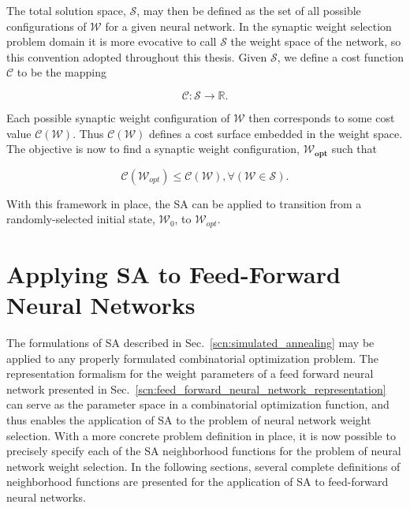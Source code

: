 \documentclass[11pt]{afthesis}
\begin{document}
	 \noindent The total solution space, $\boldsymbol{\mathcal{S}}$, may then be defined as the set of all possible configurations of $\boldsymbol{\mathcal{W}}$ for a given neural network. In the synaptic weight selection problem domain it is more evocative to call $\boldsymbol{\mathcal{S}}$ the weight space of the network, so this convention adopted throughout this thesis. Given $\boldsymbol{\mathcal{S}}$, we define a cost function $ \mathcal{C}$ to be the mapping
	 
	 \begin{equation*} \label{eq:cost_mapping_ffnn}
	 \mathcal{C} : \boldsymbol{\mathcal{S}} \rightarrow \mathbb{R}.
	 \end{equation*}
	 
	 
	 Each possible synaptic weight configuration of $\boldsymbol{\mathcal{W}}$ then corresponds to some cost value $\mathcal{C}(\boldsymbol{\mathcal{W}})$. Thus $\mathcal{C}(\boldsymbol{\mathcal{W}})$ defines a cost surface embedded in the weight space. The objective is now to find a synaptic weight configuration, $\boldsymbol{\mathcal{W}_{opt}}$ such that 
	 
	 \begin{equation*} \label{eq:optimal_definition}
	 \mathcal{C}(\boldsymbol{\mathcal{W}}_{opt}) \leq \mathcal{C}\left( \boldsymbol{\mathcal{W}}\right) , \forall\left(  \boldsymbol{\mathcal{W}} \in \boldsymbol{\mathcal{S}}\right) .
	 \end{equation*}
	 
	 \noindent With this framework in place, the SA can be applied to transition from a randomly-selected initial state, $\boldsymbol{\mathcal{W}}_0$, to $\boldsymbol{\mathcal{W}}_{opt}$.
	 

	\section{Applying SA to Feed-Forward Neural Networks}
	
	The formulations of SA described in Sec.~\ref{scn:simulated_annealing} may be applied to any properly formulated combinatorial optimization problem. The representation formalism for the weight parameters of a feed forward neural network presented in Sec.~\ref{scn:feed_forward_neural_network_representation} can serve as the parameter space in a combinatorial optimization function, and thus enables the application of SA to the problem of neural network weight selection. With a more concrete problem definition in place, it is now possible to precisely specify each of the SA neighborhood functions for the problem of neural network weight selection. In the following sections, several complete definitions of neighborhood functions are presented for the application of SA to feed-forward neural networks. 
	
\end{document}

